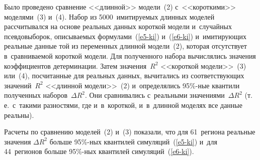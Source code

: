 \begin{multicols}{2}
  Было проведено сравнение <<длинной>> модели~(2) с~<<короткими>> моделями~(3) 
и~(4). Набор из 5000~имитируемых длинных моделей рассчитывался на основе 
 реальных данных короткой модели и~случайных 
псевдовыборок,
описываемых формулами~(\ref{e5-ki}) и~(\ref{e6-ki}) и~имитирующих реальные данные той из переменных длинной 
модели~(2), которая отсутствует в~сравниваемой короткой модели. Для полученного 
набора вычислялись значения коэффициентов детерминации. Затем значения~$R^2$ 
<<короткой модели>>~(3) или~(4), посчитанные для реальных данных, вычитались из 
соответствующих значений~$R^2$ <<длинной модели>>~(2) и~определялись 95\%-ные 
квантили полученных наборов~$\Delta R^2$. Они сравнивались с~реальными 
значениями~$\Delta R^2$ (т.\,е.\ с~такими разностями, где и~в~короткой, и~в~длинной моделях все 
данные реальны).
  


  Расчеты по сравнению моделей~(2) и~(3) показали, что для 61~региона реальные 
значения $\Delta R^2$ больше 95\%-ных квантилей симуляций~(\ref{e5-ki}) и~для 44~регионов 
больше 95\%-ных квантилей симуляций~(\ref{e6-ki}).

\pagebreak

\end{multicols}

\setcounter{figure}{1}
\begin{figure*} %
\vspace*{1pt}
 \begin{center}
 \mbox{%
 \epsfxsize=151.133mm 
 }
 \end{center}
   \vspace*{-9pt}
\vspace*{6pt}
\end{figure*}

